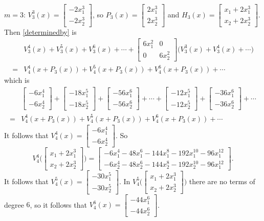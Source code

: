 \documentclass{article}
\theoremstyle{definition}
\begin{document}
$m=3$: $V_3^3(x)=\begin{bmatrix}-2x_1^3\\-2x_2^3\end{bmatrix}$, so
$P_3(x)=\begin{bmatrix}2x_1^3\\2x_2^3\end{bmatrix}$ and
$H_3(x)=\begin{bmatrix}x_1+2x_1^3\\x_2+2x_2^3\end{bmatrix}$.
Then \eqref{determinedby} is
\[
\begin{split}
&V_3^4(x)+V_3^5(x)+V_3^6(x)+\cdots+\begin{bmatrix}6x_1^2&0\\0&6x_2^2\end{bmatrix}\bigg( V_3^3(x)+V_3^4(x)+
\cdots\bigg)\\
=&V_4^4(x+P_3(x))+V_4^5(x+P_3(x))+V_4^6(x+P_3(x))+\cdots
\end{split}
\]
which is
\[
\begin{split}
&\begin{bmatrix}-6x_1^4\\-6x_2^4\end{bmatrix}+\begin{bmatrix}-18x_1^5\\-18x_2^5\end{bmatrix}
+\begin{bmatrix}-56x_1^6\\-56x_2^6\end{bmatrix}+\cdots
+\begin{bmatrix}-12x_1^5\\-12x_2^5\end{bmatrix}
+\begin{bmatrix}-36x_1^6\\-36x_2^6\end{bmatrix}+\cdots\\
=&V_4^4(x+P_3(x))+V_4^5(x+P_3(x))+V_4^6(x+P_3(x))+\cdots
\end{split}
\]
It follows that $V_4^4(x)=\begin{bmatrix}-6x_1^4\\-6x_2^4\end{bmatrix}$. 
So
\[
V_4^4\Big( \begin{bmatrix}x_1+2x_1^3\\x_2+2x_2^3\end{bmatrix}\Big)
=
\begin{bmatrix}
-6x_1^4-48x_1^6-144x_1^8-192x_1^{10}-96x_1^{12}\\
-6x_2^4-48x_2^6-144x_2^8-192x_2^{10}-96x_1^{12}
\end{bmatrix}.
\]
It follows that $V_4^5(x)=\begin{bmatrix}-30x_1^5\\-30x_2^5\end{bmatrix}$.
In $V_4^5\Big( \begin{bmatrix}x_1+2x_1^3\\x_2+2x_2^3\end{bmatrix}\Big)$ there are no terms
of degree $6$, so it follows that $V_4^6(x)=\begin{bmatrix}-44x_1^6\\-44x_2^6\end{bmatrix}$.
\end{document}
